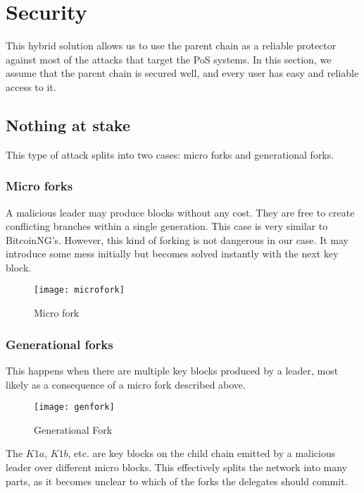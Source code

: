 \section{Security}

This hybrid solution allows us to use the parent chain as a reliable protector
against most of the attacks that target the PoS systems\cite{pos_attacks}. In
this section, we assume that the parent chain is secured well, and every user
has easy and reliable access to it.

\subsection{Nothing at stake}

This type of attack splits into two cases: micro forks and generational forks.

\subsubsection{Micro forks}

A malicious leader may produce blocks without any cost. They are free to create
conflicting branches within a single generation. This case is very similar to
BitcoinNG's\cite{bcng}. However, this kind of forking is not dangerous in our
case. It may introduce some mess initially but becomes solved instantly with the
next key block.

\begin{figure}[h]
	\caption{Micro fork}
	\centering
	\texttt{[image: microfork]}
\end{figure}

\subsubsection{Generational forks}

This happens when there are multiple key blocks produced by a leader, most
likely as a consequence of a micro fork described above.

\begin{figure}[h]
	\caption{Generational Fork}
	\centering
	\texttt{[image: genfork]}
\end{figure}

The $K1a$, $K1b$, etc. are key blocks on the child chain emitted by a malicious
leader over different micro blocks. This effectively splits the network into
many parts, as it becomes unclear to which of the forks the delegates should
commit.

